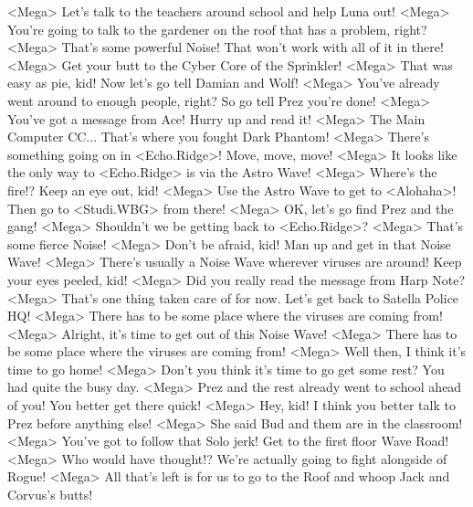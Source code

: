 <Mega> Let's talk to the teachers around school and help Luna out! 
<Mega> You're going to talk to the gardener on the roof that has a problem, right? 
<Mega> That's some powerful Noise! That won't work with all of it in there! 
<Mega> Get your butt to the Cyber Core of the Sprinkler! 
<Mega> That was easy as pie, kid! Now let's go tell Damian and Wolf! 
<Mega> You've already went around to enough people, right? So go tell Prez you're done! 
<Mega> You've got a message from Ace! Hurry up and read it! 
<Mega> The Main Computer CC... That's where you fought Dark Phantom! 
<Mega> There's something going on in <Echo.Ridge>! Move, move, move! 
<Mega> It looks like the only way to <Echo.Ridge> is via the Astro Wave! 
<Mega> Where's the fire!? Keep an eye out, kid! 
<Mega> Use the Astro Wave to get to <Alohaha>! Then go to <Studi.WBG> from there! 
<Mega> OK, let's go find Prez and the gang! 
<Mega> Shouldn't we be getting back to <Echo.Ridge>? 
<Mega> That's some fierce Noise! 
<Mega> Don't be afraid, kid! Man up and get in that Noise Wave! 
<Mega> There's usually a Noise Wave wherever viruses are around! Keep your eyes peeled, kid! 
<Mega> Did you really read the message from Harp Note? 
<Mega> That's one thing taken care of for now. Let's get back to Satella Police HQ! 
<Mega> There has to be some place where the viruses are coming from! 
<Mega> Alright, it's time to get out of this Noise Wave! 
<Mega> There has to be some place where the viruses are coming from! 
<Mega> Well then, I think it's time to go home! 
<Mega> Don't you think it's time to go get some rest? You had quite the busy day. 
<Mega> Prez and the rest already went to school ahead of you! You better get there quick! 
<Mega> Hey, kid! I think you better talk to Prez before anything else! 
<Mega> She said Bud and them are in the classroom! 
<Mega> You've got to follow that Solo jerk! Get to the first floor Wave Road! 
<Mega> Who would have thought!? We're actually going to fight alongside of Rogue! 
<Mega> All that's left is for us to go to the Roof and whoop Jack and Corvus's butts! 
